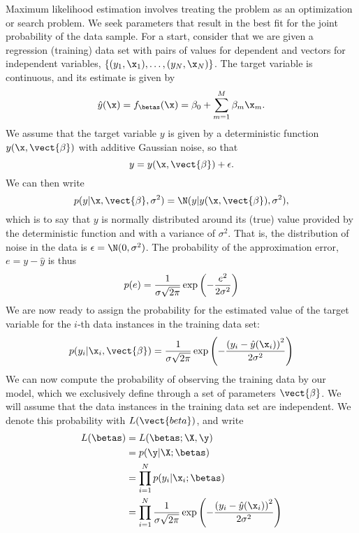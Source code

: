 \begin{refsection}
Maximum likelihood estimation involves treating the problem as an optimization or search problem. We seek parameters that result in the best fit for the joint probability of the data sample. For a start, consider that we are given a regression (training) data set with pairs of values for dependent and vectors for independent variables, $\{(y_1,\x_1), \ldots, (y_N,\x_N)\}$. The target variable is continuous, and its estimate is given by
\begin{equation}
\hat y(\x)=f_{\betas}(\x)=\beta_0+\sum_{m=1}^M\beta_m\x_m.
\end{equation}
We assume that the target variable $y$ is given by a deterministic function $y(\x,\vect{\beta})$ with additive Gaussian noise, so that
\begin{equation}
y=y(\x,\vect{\beta})+\epsilon.
\end{equation}
We can then write
\begin{equation}
p(y|\x,\vect{\beta},\sigma^2) = \N(y|y(\x,\vect{\beta}),\sigma^2),
\end{equation}
which is to say that $y$ is normally distributed around its (true) value provided by the deterministic function and with a variance of $\sigma^2$. That is, the distribution of noise in the data is $\epsilon=\N(0,\sigma^2)$.  The probability of the approximation error, $e=y-\hat{y}$ is thus
\begin{equation}
p(e)={1\over\sigma\sqrt{2\pi}}\exp\left({-{e^2\over 2\sigma^2}}\right)
\end{equation}
We are now ready to assign the probability for the estimated value of the target variable for the $i$-th data instances in the training data set:
\begin{equation}
p(y_i|\x_i,\vect{\beta}) = {1\over\sigma\sqrt{2\pi}}\exp\left({-{\left(y_i-\hat{y}(\x_i)\right)^2\over 2\sigma^2}}\right)
\end{equation}
We can now compute the probability of observing the training data by our model, which we exclusively define through a set of parameters $\vect{\beta}$. We will assume that the data instances in the training data set are independent. We denote this probability with $L(\vect{beta})$, and write
\begin{align}
L(\betas) & = L(\betas; \X, \y) \\
& = p(\y|\X;\betas) \\
& = \prod_{i=1}^N p(y_i|\x_i;\betas) \\
& = \prod_{i=1}^N {1\over\sigma\sqrt{2\pi}} \exp\left({-{\left(y_i-\hat{y}(\x_i)\right)^2\over 2\sigma^2}}\right)
\end{align}


\end{refsection}
